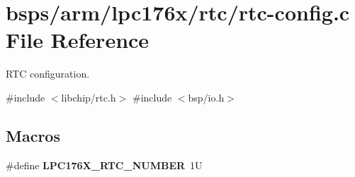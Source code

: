 \hypertarget{arm_2lpc176x_2rtc_2rtc-config_8c}{}\section{bsps/arm/lpc176x/rtc/rtc-\/config.c File Reference}
\label{arm_2lpc176x_2rtc_2rtc-config_8c}


R\+TC configuration.  


{\ttfamily \#include $<$libchip/rtc.\+h$>$}\newline
{\ttfamily \#include $<$bsp/io.\+h$>$}\newline
\subsection*{Macros}
\begin{DoxyCompactItemize}
\item 
\mbox{\label{arm_2lpc176x_2rtc_2rtc-config_8c_a08f04abef12db951c3ddd6b163e9f30c}} 
\#define {\bfseries L\+P\+C176\+X\+\_\+\+R\+T\+C\+\_\+\+N\+U\+M\+B\+ER}~1U
\end{DoxyCompactItemize}
